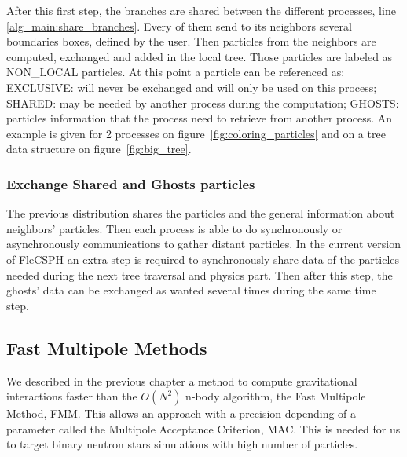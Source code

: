 After this first step, the branches are shared between the different processes, line \ref{alg_main:share_branches}. 
Every of them send to its neighbors several boundaries boxes, defined by the user. 
Then particles from the neighbors are computed, exchanged and added in the local tree. 
Those particles are labeled as NON\_LOCAL particles. 
At this point a particle can be referenced as: EXCLUSIVE: will never be exchanged and will only be used on this process; SHARED: may be needed by another process during the computation; GHOSTS: particles information that the process need to retrieve from another process. 
An example is given for 2 processes on figure~\ref{fig:coloring_particles} and on a tree data structure on figure~\ref{fig:big_tree}.

\subsubsection{Exchange Shared and Ghosts particles}

The previous distribution shares the particles and the general information about neighbors’ particles. 
Then each process is able to do synchronously or asynchronously communications to gather distant particles. 
In the current version of FleCSPH an extra step is required to synchronously share data of the particles needed during the next tree traversal and physics part. 
Then after this step, the ghosts’ data can be exchanged as wanted several times during the same time step. 

\subsection{Fast Multipole Methods}

We described in the previous chapter a method to compute gravitational interactions faster than the $O(N^2)$ n-body algorithm, the Fast Multipole Method, FMM.
This allows an approach with a precision depending of a parameter called the Multipole Acceptance Criterion, MAC. 
This is needed for us to target binary neutron stars simulations with high number of particles.

